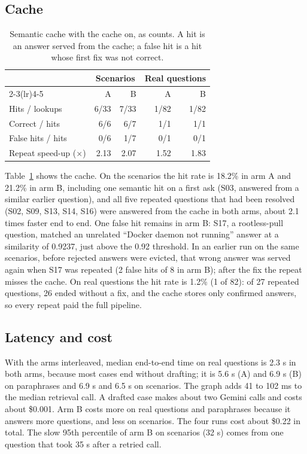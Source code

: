 \documentclass[cameraready]{ieeeconf}
\begin{document}
\subsection{Cache}
\begin{table}[t]
\caption{Semantic cache with the cache on, as counts. A hit is an answer served from the cache; a false hit is a hit whose first fix was not correct.}
\label{tab:cache}
\centering
\footnotesize
\setlength{\tabcolsep}{3pt}
\begin{tabular}{@{}lrrrr@{}}
\toprule
 & \multicolumn{2}{c}{Scenarios} & \multicolumn{2}{c}{Real questions} \\
\cmidrule(lr){2-3}\cmidrule(lr){4-5}
 & A & B & A & B \\
\midrule
Hits / lookups & 6/33 & 7/33 & 1/82 & 1/82 \\
Correct / hits & 6/6 & 6/7 & 1/1 & 1/1 \\
False hits / hits & 0/6 & 1/7 & 0/1 & 0/1 \\
Repeat speed-up ($\times$) & 2.13 & 2.07 & 1.52 & 1.83 \\
\bottomrule
\end{tabular}
\end{table}
Table~\ref{tab:cache} shows the cache. On the scenarios the hit rate is 18.2\% in arm A and 21.2\% in arm B, including one semantic hit on a first ask (S03, answered from a similar earlier question), and all five repeated questions that had been resolved (S02, S09, S13, S14, S16) were answered from the cache in both arms, about 2.1 times faster end to end. One false hit remains in arm B: S17, a rootless-pull question, matched an unrelated ``Docker daemon not running'' answer at a similarity of 0.9237, just above the 0.92 threshold. In an earlier run on the same scenarios, before rejected answers were evicted, that wrong answer was served again when S17 was repeated (2 false hits of 8 in arm B); after the fix the repeat misses the cache. On real questions the hit rate is 1.2\% (1 of 82): of 27 repeated questions, 26 ended without a fix, and the cache stores only confirmed answers, so every repeat paid the full pipeline.

\subsection{Latency and cost}
With the arms interleaved, median end-to-end time on real questions is 2.3 s in both arms, because most cases end without drafting; it is 5.6 s (A) and 6.9 s (B) on paraphrases and 6.9 s and 6.5 s on scenarios. The graph adds 41 to 102 ms to the median retrieval call. A drafted case makes about two Gemini calls and costs about \$0.001. Arm B costs more on real questions and paraphrases because it answers more questions, and less on scenarios. The four runs cost about \$0.22 in total. The slow 95th percentile of arm B on scenarios (32 s) comes from one question that took 35 s after a retried call.
\end{document}
